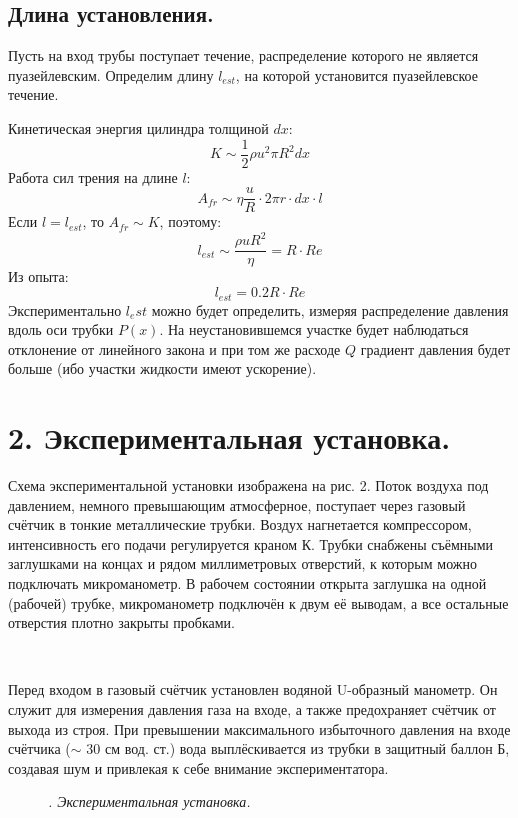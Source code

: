\documentclass[a4paper]{article}
\begin{document}
\subsection*{Длина установления.}
Пусть на вход трубы поступает течение, распределение которого не является пуазейлевским. Определим длину $l_{est}$, на которой установится пуазейлевское течение. 

\noindent
Кинетическая энергия цилиндра толщиной $dx$:
\[K \sim \frac{1}{2} \rho u^2  \pi R^2 dx \]
Работа сил трения на длине $l$:
\[A_{fr} \sim \eta \frac{u}{R} \cdot 2\pi r \cdot dx \cdot l\]
Если $l = l_{est}$, то $A_{fr} \sim K$, поэтому:
\[l_{est} \sim \frac{\rho u R^2}{\eta}  = R \cdot Re\]
Из опыта:
\begin{equation}\label{eq5}
l_{est} = 0.2 R \cdot Re 
\end{equation}
Экспериментально $l_est$ можно будет определить, измеряя распределение давления вдоль оси трубки $P(x)$. На неустановившемся участке будет наблюдаться отклонение от линейного закона и при том же расходе $Q$ градиент давления будет больше (ибо участки жидкости имеют ускорение).

\section*{2. Экспериментальная установка.}
\noindent
Схема экспериментальной установки изображена на рис. 2. Поток воздуха под давлением, немного превышающим атмосферное, поступает через газовый счётчик в тонкие металлические трубки. Воздух нагнетается компрессором, интенсивность его подачи регулируется краном К. Трубки снабжены
съёмными заглушками на концах и рядом миллиметровых отверстий, к которым можно подключать микроманометр. В рабочем состоянии открыта заглушка на одной (рабочей) трубке, микроманометр подключён к двум её выводам, а все остальные отверстия плотно закрыты пробками.

\

\noindent
Перед входом в газовый счётчик установлен водяной U-образный манометр. Он служит для измерения давления газа на входе, а также предохраняет
счётчик от выхода из строя. При превышении максимального избыточного
давления на входе счётчика ($\sim$ 30 см вод. ст.) вода выплёскивается из трубки
в защитный баллон Б, создавая шум и привлекая к себе внимание экспериментатора.

\begin{figure}
\caption{\textit{. Экспериментальная установка.}}
\end{figure}
\end{document}
